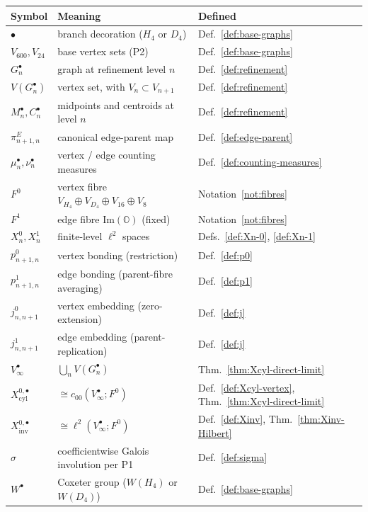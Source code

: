 \documentclass[11pt, a4paper]{amsart}
\theoremstyle{definition}
\newcommand{\OO}{\mathbb{O}}
\newcommand{\inv}{\mathrm{inv}}
\newcommand{\cyl}{\mathrm{cyl}}
\renewcommand{\Im}{\mathrm{Im}}
\begin{document}
\begin{center}
\begin{tabular}{lll}
\hline
Symbol & Meaning & Defined \\
\hline
$\bullet$ & branch decoration ($H_4$ or $D_4$) & Def.~\ref{def:base-graphs} \\
$V_{600}, V_{24}$ & base vertex sets (P2) & Def.~\ref{def:base-graphs} \\
$G_n^\bullet$ & graph at refinement level $n$ & Def.~\ref{def:refinement} \\
$V(G_n^\bullet)$ & vertex set, with $V_n \subset V_{n+1}$ & Def.~\ref{def:refinement} \\
$M_n^\bullet, C_n^\bullet$ & midpoints and centroids at level $n$ & Def.~\ref{def:refinement} \\
$\pi_{n+1, n}^E$ & canonical edge-parent map & Def.~\ref{def:edge-parent} \\
$\mu_n^\bullet, \nu_n^\bullet$ & vertex / edge counting measures & Def.~\ref{def:counting-measures} \\
$F^0$ & vertex fibre $V_{H_4}\oplus V_{D_4}\oplus V_{16}\oplus V_8$ & Notation~\ref{not:fibres} \\
$F^1$ & edge fibre $\Im(\OO)$ (fixed) & Notation~\ref{not:fibres} \\
$X_n^0, X_n^1$ & finite-level $\ell^2$ spaces & Defs.~\ref{def:Xn-0}, \ref{def:Xn-1} \\
$p_{n+1, n}^0$ & vertex bonding (restriction) & Def.~\ref{def:p0} \\
$p_{n+1, n}^1$ & edge bonding (parent-fibre averaging) & Def.~\ref{def:p1} \\
$j_{n, n+1}^0$ & vertex embedding (zero-extension) & Def.~\ref{def:j} \\
$j_{n, n+1}^1$ & edge embedding (parent-replication) & Def.~\ref{def:j} \\
$V_\infty^\bullet$ & $\bigcup_n V(G_n^\bullet)$ & Thm.~\ref{thm:Xcyl-direct-limit} \\
$X_\cyl^{0, \bullet}$ & $\cong c_{00}(V_\infty^\bullet; F^0)$ & Def.~\ref{def:Xcyl-vertex}, Thm.~\ref{thm:Xcyl-direct-limit} \\
$X_\inv^{0, \bullet}$ & $\cong \ell^2(V_\infty^\bullet; F^0)$ & Def.~\ref{def:Xinv}, Thm.~\ref{thm:Xinv-Hilbert} \\
$\sigma$ & coefficientwise Galois involution per P1 & Def.~\ref{def:sigma} \\
$W^\bullet$ & Coxeter group ($W(H_4)$ or $W(D_4)$) & Def.~\ref{def:base-graphs} \\
\hline
\end{tabular}
\end{center}
\end{document}
